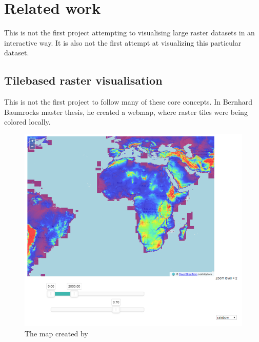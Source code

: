 \chapter{Related work}

This is not the first project attempting to visualising large raster datasets in an interactive way. It is also not the first attempt at visualizing this particular dataset. 


\section{Tilebased raster visualisation}

This is not the first project to follow many of these core concepts. In Bernhard Baumrocks master thesis, he created a webmap, where raster tiles were being colored locally. \citep{Buamrocks}
\begin{figure} [H]
	\centering
	\includegraphics[width=.8\textwidth]{Pictures/BaumrockMap1}
	\caption{The map created by \citep{EOX}}
	\label{BaumrockMap1}
\end{figure}

